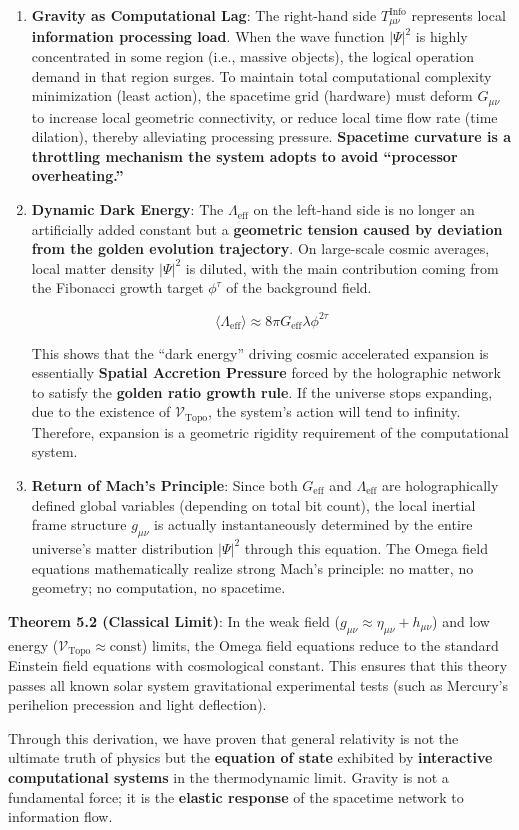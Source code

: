 \begin{enumerate}
\item \textbf{Gravity as Computational Lag}:
   The right-hand side $T_{\mu\nu}^{\text{Info}}$ represents local \textbf{information processing load}. When the wave function $|\Psi|^2$ is highly concentrated in some region (i.e., massive objects), the logical operation demand in that region surges. To maintain total computational complexity minimization (least action), the spacetime grid (hardware) must deform $G_{\mu\nu}$ to increase local geometric connectivity, or reduce local time flow rate (time dilation), thereby alleviating processing pressure. \textbf{Spacetime curvature is a throttling mechanism the system adopts to avoid ``processor overheating.''}

\item \textbf{Dynamic Dark Energy}:
   The $\Lambda_{\text{eff}}$ on the left-hand side is no longer an artificially added constant but a \textbf{geometric tension caused by deviation from the golden evolution trajectory}.
   On large-scale cosmic averages, local matter density $|\Psi|^2$ is diluted, with the main contribution coming from the Fibonacci growth target $\phi^{\tau}$ of the background field.

\[\langle \Lambda_{\text{eff}} \rangle \approx 8\pi G_{\text{eff}} \lambda \phi^{2\tau}\]

This shows that the ``dark energy'' driving cosmic accelerated expansion is essentially \textbf{Spatial Accretion Pressure} forced by the holographic network to satisfy the \textbf{golden ratio growth rule}. If the universe stops expanding, due to the existence of $\mathcal{V}_{\text{Topo}}$, the system's action will tend to infinity. Therefore, expansion is a geometric rigidity requirement of the computational system.

\item \textbf{Return of Mach's Principle}:
   Since both $G_{\text{eff}}$ and $\Lambda_{\text{eff}}$ are holographically defined global variables (depending on total bit count), the local inertial frame structure $g_{\mu\nu}$ is actually instantaneously determined by the entire universe's matter distribution $|\Psi|^2$ through this equation. The Omega field equations mathematically realize strong Mach's principle: no matter, no geometry; no computation, no spacetime.
\end{enumerate}

\textbf{Theorem 5.2 (Classical Limit)}:
In the weak field ($g_{\mu\nu} \approx \eta_{\mu\nu} + h_{\mu\nu}$) and low energy ($\mathcal{V}_{\text{Topo}} \approx \text{const}$) limits, the Omega field equations reduce to the standard Einstein field equations with cosmological constant. This ensures that this theory passes all known solar system gravitational experimental tests (such as Mercury's perihelion precession and light deflection).

Through this derivation, we have proven that general relativity is not the ultimate truth of physics but the \textbf{equation of state} exhibited by \textbf{interactive computational systems} in the thermodynamic limit. Gravity is not a fundamental force; it is the \textbf{elastic response} of the spacetime network to information flow.
